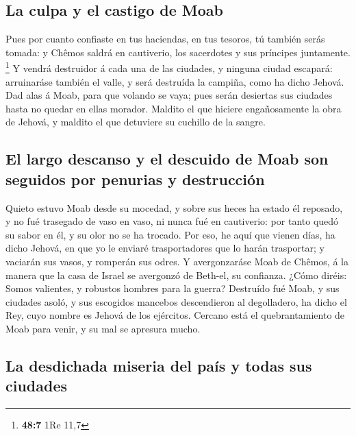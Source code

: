 \hypertarget{la-culpa-y-el-castigo-de-moab}{%
\subsection{La culpa y el castigo de
Moab}\label{la-culpa-y-el-castigo-de-moab}}

 Pues por cuanto confiaste en tus haciendas, en tus
tesoros, tú también serás tomada: y Chêmos saldrá en cautiverio, los
sacerdotes y sus príncipes juntamente. \footnote{\textbf{48:7} 1Re 11,7}
 Y vendrá destruidor á cada una de las ciudades, y ninguna
ciudad escapará: arruinaráse también el valle, y será destruída la
campiña, como ha dicho Jehová.  Dad alas á Moab, para que
volando se vaya; pues serán desiertas sus ciudades hasta no quedar en
ellas morador.  Maldito el que hiciere engañosamente la
obra de Jehová, y maldito el que detuviere su cuchillo de la sangre.

\hypertarget{el-largo-descanso-y-el-descuido-de-moab-son-seguidos-por-penurias-y-destrucciuxf3n}{%
\subsection{El largo descanso y el descuido de Moab son seguidos por
penurias y
destrucción}\label{el-largo-descanso-y-el-descuido-de-moab-son-seguidos-por-penurias-y-destrucciuxf3n}}

 Quieto estuvo Moab desde su mocedad, y sobre sus heces
ha estado él reposado, y no fué trasegado de vaso en vaso, ni nunca fué
en cautiverio: por tanto quedó su sabor en él, y su olor no se ha
trocado.  Por eso, he aquí que vienen días, ha dicho
Jehová, en que yo le enviaré trasportadores que lo harán trasportar; y
vaciarán sus vasos, y romperán sus odres.  Y
avergonzaráse Moab de Chêmos, á la manera que la casa de Israel se
avergonzó de Beth-el, su confianza.  ¿Cómo diréis: Somos
valientes, y robustos hombres para la guerra?  Destruído
fué Moab, y sus ciudades asoló, y sus escogidos mancebos descendieron al
degolladero, ha dicho el Rey, cuyo nombre es Jehová de los ejércitos.
 Cercano está el quebrantamiento de Moab para venir, y su
mal se apresura mucho.

\hypertarget{la-desdichada-miseria-del-pauxeds-y-todas-sus-ciudades}{%
\subsection{La desdichada miseria del país y todas sus
ciudades}\label{la-desdichada-miseria-del-pauxeds-y-todas-sus-ciudades}}

